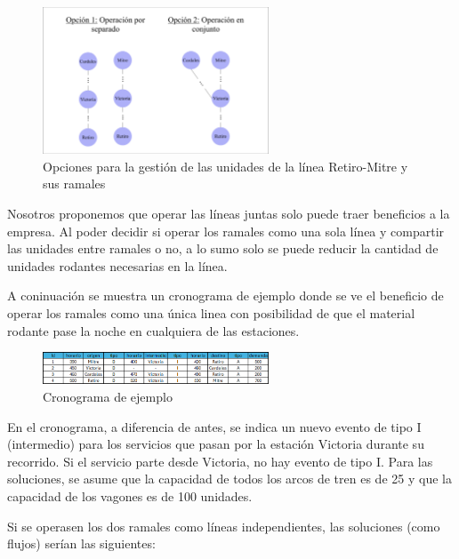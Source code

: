 \documentclass{article}
\begin{document}
\begin{figure}[H]
    \centering
    \includegraphics[width=0.6\textwidth]{esquema_escenario_adic.png}
    \caption{Opciones para la gestión de las unidades de la línea Retiro-Mitre y sus ramales}
    \label{fig:ejemplo}
\end{figure}

Nosotros proponemos que operar las líneas juntas solo puede traer beneficios a la empresa. Al poder decidir si operar los ramales como una sola línea y compartir las unidades entre ramales o no, a lo sumo solo se puede reducir la cantidad de unidades rodantes necesarias en la línea.

A coninuación se muestra un cronograma de ejemplo donde se ve el beneficio de operar los ramales como una única linea con posibilidad de que el material rodante pase la noche en cualquiera de las estaciones.

\begin{figure}[H]
    \centering
    \includegraphics[width=0.6\textwidth]{escenario_adic_ejemplo.png}
    \caption{Cronograma de ejemplo}
    \label{fig:ejemplo}
\end{figure}

En el cronograma, a diferencia de antes, se indica un nuevo evento de tipo I (intermedio) para los servicios que pasan por la estación Victoria durante su recorrido. Si el servicio parte desde Victoria, no hay evento de tipo I. Para las soluciones, se asume que la capacidad de todos los arcos de tren es de 25 y que la capacidad de los vagones es de 100 unidades.

Si se operasen los dos ramales como líneas independientes, las soluciones (como flujos) serían las siguientes:
\end{document}
